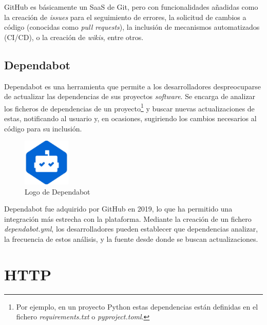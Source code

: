 GitHub es básicamente un SaaS de Git, pero con funcionalidades añadidas como la creación de \emph{issues} para el seguimiento de errores, la solicitud de cambios a código (conocidas como \emph{pull requests}), la inclusión de mecanismos automatizados (CI/CD), o la creación de \emph{wikis}, entre otros. \emph{\parencite{Reference22}}

\subsection{Dependabot}

Dependabot es una herramienta que permite a los desarrolladores despreocuparse de actualizar las dependencias de sus proyectos \emph{software}. Se encarga de analizar los ficheros de dependencias de un proyecto\footnote{Por ejemplo, en un proyecto Python estas dependencias están definidas en el fichero \emph{requirements.txt} o \emph{pyproject.toml}.} y buscar nuevas actualizaciones de estas, notificando al usuario y, en ocasiones, sugiriendo los cambios necesarios al código para su inclusión. \emph{\parencite{Reference24}}

\begin{figure}[ht]
    \centering
    \includegraphics[width=0.2\textwidth]{Figures/dependabot-logo}
    \decoRule
    \caption[Dependabot (Logo)]{Logo de Dependabot \emph{\parencite{Reference25}}}
    \label{fig:dependabot-logo}
\end{figure}

Dependabot fue adquirido por GitHub en 2019, lo que ha permitido una integración más estrecha con la plataforma. Mediante la creación de un fichero \emph{dependabot.yml}, los desarrolladores pueden establecer que dependencias analizar, la frecuencia de estos análisis, y la fuente desde donde se buscan actualizaciones. \emph{\parencite{Reference24}}


\section{HTTP}

